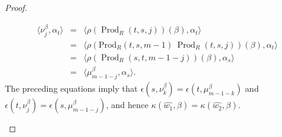 \documentclass[12pt]{amsart}
\numberwithin{equation}{section}
\begin{document}
\begin{proof}
\begin{enumerate}
\begin{eqnarray*}
\langle \nu^\beta_{j}, \alpha_t \rangle &=&
\langle \rho(\operatorname{Prod}_R\left(t,s, j\right))(\beta) , \alpha_t \rangle \\ 
&=& \langle \rho(\text{Prod}_{R}(t,s,m-1)~ \operatorname{Prod}_R\left(t,s, j\right))(\beta), \alpha_t \rangle\\
&=& \langle \rho(\operatorname{Prod}_R\left(s,t, m-1-j\right))(\beta) , \alpha_s \rangle\\
&=& \langle \mu^\beta_{m-1-j}, \alpha_s \rangle.
\end{eqnarray*}
The preceding equations imply that $\epsilon(s,\nu^\beta_k)= \epsilon(t,\mu^\beta_{m-1-k})$ and $\epsilon(t,\nu^\beta_j)= \epsilon(s,\mu^\beta_{m-1-j})$, and hence  $\kappa(\widehat{w_1}, \beta)=\kappa(\widehat{w_2}, \beta)$. 
\par



\end{enumerate}
\end{proof}
\end{document}

